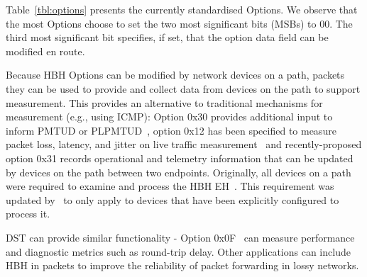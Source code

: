 \documentclass[conference]{IEEEtran}
\begin{document}
Table~\ref{tbl:options} presents the currently standardised 
Options.  We observe that the most Options choose to set the two most significant bits
(MSBs) to 00.  The third most significant bit specifies, if set, that the option data field can be modified en route.

Because HBH Options can be modified by network devices on a path, packets they can be used to provide and collect data from devices on the path to support measurement. This provides an alternative to traditional mechanisms for measurement (e.g., using ICMP):
Option 0x30 provides additional input to inform  PMTUD or PLPMTUD~\cite{rfc9268}, option
0x12 has been specified to measure packet loss, latency, and jitter on live
traffic measurement~\cite{rfc9343} and recently-proposed option 0x31 records
operational and telemetry information that can be updated by devices on the
path between two endpoints. 
Originally, all devices on a path were required to examine and process the HBH EH~\cite{rfc2460}. This requirement was updated by~\cite{RFC8200} to
only apply to devices that have been explicitly configured to process it.


DST can provide similar functionality - Option 0x0F~\cite{rfc8250} can measure performance and diagnostic metrics such as round-trip delay. Other applications can include HBH in packets to improve the reliability of packet forwarding in lossy networks.


\end{document}
